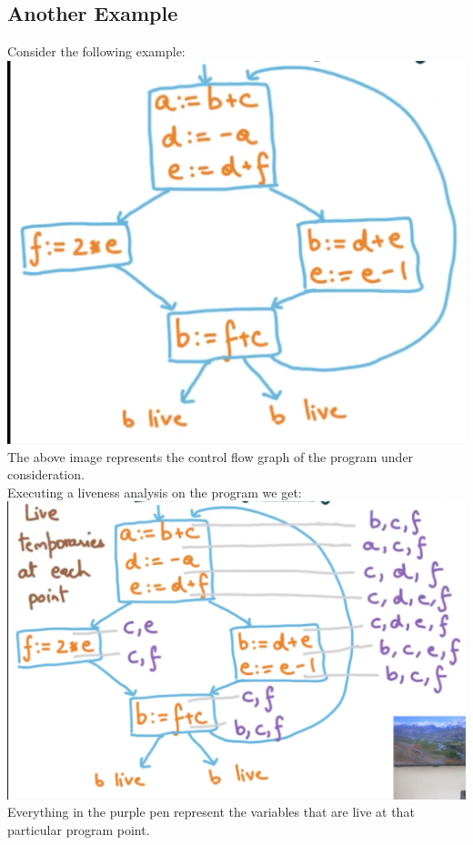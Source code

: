\subsection{Another Example}
Consider the following example:\\
\includegraphics[scale=0.2]{images/85_eg.png}\\
The above image represents the control flow graph of the program under consideration.\\
Executing a liveness analysis on the program we get:\\
\includegraphics[scale=0.2]{images/85_eg2.png}\\
Everything in the purple pen represent the variables that are live at that particular program point.\\
